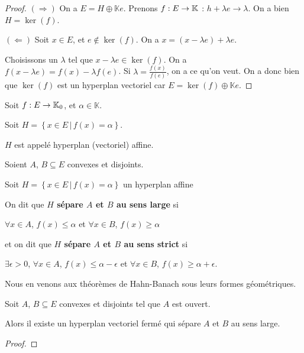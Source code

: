 \ifdefined\outputproof
\begin{proof}
	$(\Rightarrow)$ On a $E = H \oplus \mathbb{K}e$. Prenons
	$f : E \rightarrow \mathbb{K}$ : $h + \lambda e \rightarrow \lambda$.
	On a bien $H = \ker(f)$.

	$(\Leftarrow)$ Soit $x \in E$, et $e \notin \ker(f)$. On a $x = (x - \lambda
	e) + \lambda e$.

	Choisissons un $\lambda$ tel que $x - \lambda e \in
	\ker(f)$. On a $f(x - \lambda e) = f(x) - \lambda f(e)$. Si $\lambda =
	\frac{f(x)}{f(e)}$, on a ce qu'on veut.
	On a donc bien que $\ker(f)$ est un hyperplan vectoriel car $E = \ker(f)
	\oplus \mathbb{K}e$.
\end{proof}
\fi

\begin{definition} 
	Soit $f : E \rightarrow \mathbb{K}_{0}$, et $\alpha \in \mathbb{K}$.

	Soit $H = \left\{ x \in E \, | \, f(x) = \alpha \right\}$.

	$H$ est appelé hyperplan (vectoriel) affine.
\end{definition}


\begin{definition}
	Soient $A$, $B \subseteq E$ convexes et disjoints.

	Soit $H = \left\{ x \in E \, | \, f(x) = \alpha\right\}$ un hyperplan affine

	On dit que \textbf{$H$ sépare $A$ et $B$ au sens large} si

	$\forall x \in A$, $f(x) \leq \alpha$ et $\forall x \in B$, $f(x) \geq
	\alpha$

	et on dit que \textbf{$H$ sépare $A$ et $B$ au sens strict} si

	$\exists \epsilon > 0$, $\forall x \in A$, $f(x) \leq \alpha -
	\epsilon$ et $\forall x \in B$, $f(x) \geq \alpha + \epsilon$.
\end{definition}

Nous en venons aux théorèmes de Hahn-Banach sous leurs formes géométriques.

\begin{theorem} 
	Soit $A$, $B \subseteq E$ convexes et disjoints tel que $A$ est ouvert.

	Alors il existe un hyperplan vectoriel fermé qui sépare $A$ et $B$ au sens
	large.
\end{theorem}

\ifdefined\outputproof
\begin{proof}

\end{proof}
\fi

